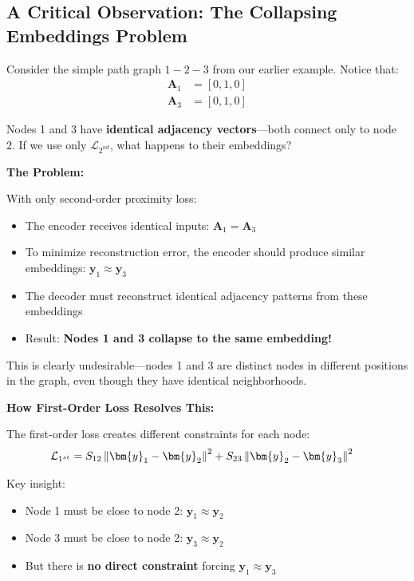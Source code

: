 \begin{notechapter}
\subsection{A Critical Observation: The Collapsing Embeddings Problem}

\begin{remark}
Consider the simple path graph $1 - 2 - 3$ from our earlier example. Notice that:
\begin{align*}
\bm{A}_1 &= [0, 1, 0] \\
\bm{A}_3 &= [0, 1, 0]
\end{align*}

Nodes 1 and 3 have \textbf{identical adjacency vectors}—both connect only to node 2. If we use only $\mathcal{L}_{2^{nd}}$, what happens to their embeddings?
\end{remark}

\textbf{The Problem:}

With only second-order proximity loss:
\begin{itemize}
    \item The encoder receives identical inputs: $\bm{A}_1 = \bm{A}_3$
    \item To minimize reconstruction error, the encoder should produce similar embeddings: $\bm{y}_1 \approx \bm{y}_3$
    \item The decoder must reconstruct identical adjacency patterns from these embeddings
    \item Result: \textbf{Nodes 1 and 3 collapse to the same embedding!}
\end{itemize}

This is clearly undesirable—nodes 1 and 3 are distinct nodes in different positions in the graph, even though they have identical neighborhoods.

\textbf{How First-Order Loss Resolves This:}

The first-order loss creates different constraints for each node:
\begin{align*}
\mathcal{L}_{1^{st}} &= S_{12} \norm{\bm{y}_1 - \bm{y}_2}^2 + S_{23} \norm{\bm{y}_2 - \bm{y}_3}^2
\end{align*}

Key insight:
\begin{itemize}
    \item Node 1 must be close to node 2: $\bm{y}_1 \approx \bm{y}_2$
    \item Node 3 must be close to node 2: $\bm{y}_3 \approx \bm{y}_2$
    \item But there is \textbf{no direct constraint} forcing $\bm{y}_1 \approx \bm{y}_3$
\end{itemize}


\end{notechapter}
